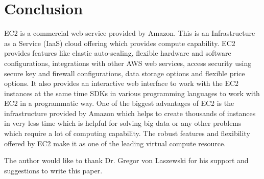 \section{Conclusion}
EC2 is a commercial web service provided by Amazon. This is an Infrastructure as a Service (IaaS) cloud offering which provides compute capability. EC2 provides features like elastic auto-scaling, flexible hardware and software configurations, integrations with other AWS web services, access security using secure key and firewall configurations, data storage options and flexible price options. It also provides an interactive web interface to work with the EC2 instances at the same time SDKs in various programming languages to work with EC2 in a programmatic way. One of the biggest advantages of EC2 is the infrastructure provided by Amazon which helps to create thousands of instances in very less time which is helpful for solving big data or any other problems which require a lot of computing capability. The robust features and flexibility offered by EC2 make it as one of the leading virtual compute resource.

\begin{acks}

  The author would like to thank Dr. Gregor von Laszewski for his
  support and suggestions to write this paper.

\end{acks}


 
